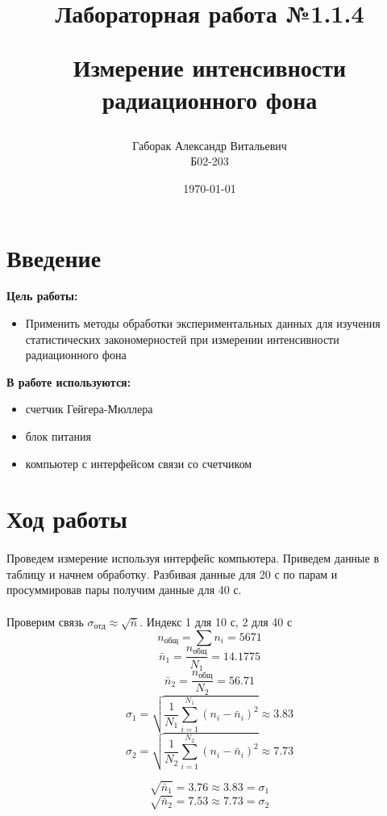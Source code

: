 \documentclass[a4paper, 12pt]{article}
\title{\begin{center}Лабораторная работа №1.1.4\end{center}
Измерение интенсивности радиационного фона}
\author{Габорак Александр Витальевич \\ Б02-203}
\date{\today}
\begin{document}
    \maketitle
    \newpage

    \section{Введение}
    \textbf{Цель работы:}
    \begin{itemize}
        \item Применить методы обработки экспериментальных данных для изучения статистических закономерностей при измерении интенсивности радиационного фона
    \end{itemize}

    \vspace{1cm}

    \textbf{В работе используются: }
    \begin{itemize}
        \item счетчик Гейгера-Мюллера
        \item блок питания
        \item компьютер с интерфейсом связи со счетчиком

    \end{itemize}

    \section{Ход работы}
    \paragraph{}
    Проведем измерение используя интерфейс компьютера. Приведем данные в таблицу и начнем  обработку. Разбивая данные для 20 с по парам и просуммировав пары получим данные для 40 с.
    \paragraph{}
    Проверим связь $\sigma_{отд}\approx \sqrt{\bar{n}}$. Индекс 1 для 10 с, 2 для 40 с
    \[n_{общ} = \sum n_i = 5671\]
    \[\bar{n}_1 = \frac{n_{общ}}{N_1} = 14.1775\]
    \[\bar{n}_2 = \frac{n_{общ}}{N_2} = 56.71\]
    \[\sigma_{1}=\sqrt{\frac{1}{N_1} \sum_{i=1}^{N_1} (n_i - \bar{n}_i)^2} \approx 3.83\]
    \[\sigma_{2}=\sqrt{\frac{1}{N_2} \sum_{i=1}^{N_2} (n_i - \bar{n}_i)^2} \approx 7.73\]
    \newpage

    \[\sqrt{\bar{n}_1} =3.76 \approx 3.83 = \sigma_1\]
    \[\sqrt{\bar{n}_2} =7.53 \approx 7.73 = \sigma_2\]
\end{document}
